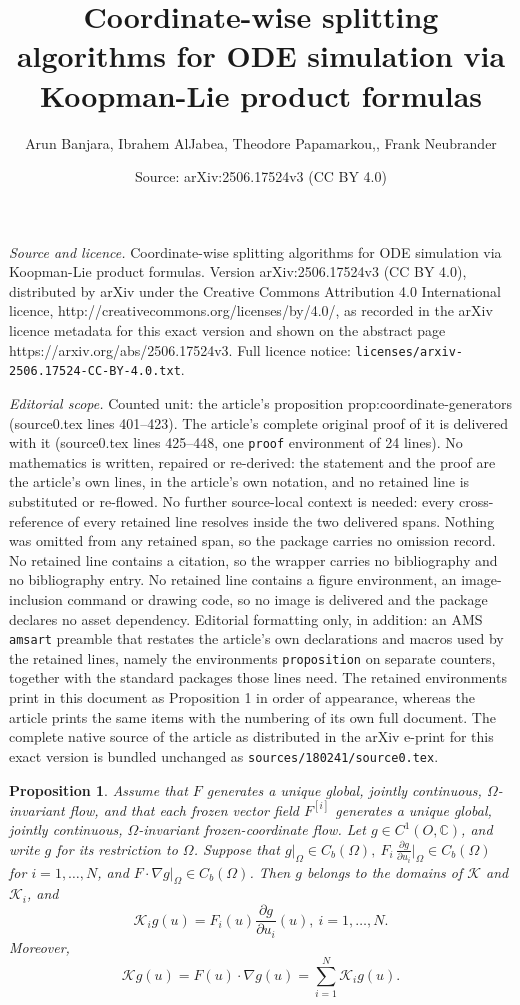 \documentclass[10pt,a4paper]{amsart}
\title{Coordinate-wise splitting algorithms for ODE simulation via Koopman-Lie product formulas}
\author{Arun Banjara, Ibrahem AlJabea, Theodore Papamarkou,, Frank Neubrander}
\date{Source: arXiv:2506.17524v3 (CC BY 4.0)}
\newtheorem{proposition}{Proposition}
\begin{document}
\maketitle

\noindent\emph{Source and licence.} Coordinate-wise splitting algorithms for ODE simulation via Koopman-Lie product formulas. Version arXiv:2506.17524v3 (CC BY 4.0), distributed by arXiv under the Creative Commons Attribution 4.0 International licence, http://creativecommons.org/licenses/by/4.0/, as recorded in the arXiv licence metadata for this exact version and shown on the abstract page https://arxiv.org/abs/2506.17524v3. Full licence notice: \texttt{licenses/arxiv-2506.17524-CC-BY-4.0.txt}.\par\smallskip

\noindent\textit{Editorial scope.} Counted unit: the article's proposition prop:coordinate-generators (source0.tex lines 401--423). The article's complete original proof of it is delivered with it (source0.tex lines 425--448, one \texttt{proof} environment of 24 lines). No mathematics is written, repaired or re-derived: the statement and the proof are the article's own lines, in the article's own notation, and no retained line is substituted or re-flowed.  No further source-local context is needed: every cross-reference of every retained line resolves inside the two delivered spans.  Nothing was omitted from any retained span, so the package carries no omission record.  No retained line contains a citation, so the wrapper carries no bibliography and no bibliography entry.  No retained line contains a figure environment, an image-inclusion command or drawing code, so no image is delivered and the package declares no asset dependency.  Editorial formatting only, in addition: an AMS \texttt{amsart} preamble that restates the article's own declarations and macros used by the retained lines, namely the environments \texttt{proposition} on separate counters, together with the standard packages those lines need.  The retained environments print in this document as Proposition 1 in order of appearance, whereas the article prints the same items with the numbering of its own full document.  The complete native source of the article as distributed in the arXiv e-print for this exact version is bundled unchanged as \texttt{sources/180241/source0.tex}.
\begin{proposition}
\label{prop:coordinate-generators}
Assume that $F$ generates a unique global, jointly continuous, $\Omega$-invariant flow, and that each frozen vector field $F^{[i]}$ generates a unique global, jointly continuous, $\Omega$-invariant frozen-coordinate flow. Let $g\in C^1(O,\mathbb{C})$, and write $g$ for its restriction to $\Omega$. Suppose that
$
g|_\Omega\in C_b(\Omega),
~
F_i\,\frac{\partial g}{\partial u_i}\Big|_\Omega\in C_b(\Omega)$ for $i=1,\ldots,N$, and $F\cdot\nabla g\big|_\Omega\in C_b(\Omega)$. Then $g$ belongs to the domains of $\mathcal{K}$ and $\mathcal{K}_i$, and
\[
\mathcal{K}_i g(u)
=
F_i(u)\frac{\partial g}{\partial u_i}(u),
~
i=1,\ldots,N.
\]
Moreover,
\[
\mathcal{K}g(u)
=
F(u)\cdot\nabla g(u)
=
\sum_{i=1}^N \mathcal{K}_i g(u).
\]
\end{proposition}
\end{document}
